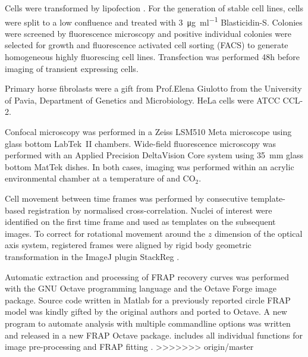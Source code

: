   Cells were transformed by lipofection .
  For the generation of stable cell lines,
  cells were split to a low confluence and treated
  with \SI{3}{\ug\per\ml} Blasticidin-S.
  Colonies were screened by fluorescence microscopy
  and positive individual colonies were selected for growth
  and fluorescence activated cell sorting (FACS) to generate
  homogeneous highly fluorescing cell lines.
  Transfection was performed 48h before imaging of
  transient expressing cells.

  Primary horse fibrolasts were a gift from Prof.\@ Elena Giulotto
  from the University of Pavia, Department of Genetics and
  Microbiology.  HeLa cells were ATCC CCL-2.

  Confocal microscopy was performed in a Zeiss LSM510 Meta microscope
  using glass bottom LabTek~II chambers.  Wide-field fluorescence
  microscopy was performed with an Applied Precision DeltaVision Core
  system using \SI{35}{\mm} glass bottom MatTek dishes.  In both
  cases, imaging was performed within an acrylic environmental chamber
  at a temperature of  and  CO$_2$.


  Cell movement between time frames was performed by consecutive
  template-based registration by normalised cross-correlation.
  Nuclei of interest were identified on the first time frame
  and used as templates on the subsequent images.
  To correct for rotational movement
  around the $z$ dimension of the optical axis system,
  registered frames were aligned by rigid body geometric transformation
  in the ImageJ \citep{imagej1} plugin StackReg \citep{stackreg}.

  Automatic extraction and processing of FRAP recovery curves was
  performed with the GNU Octave programming language \citep{octave}
  and the Octave Forge image package.  Source code written in Matlab
  for a previously reported circle FRAP model \citep{mcnally-frap-code}
  was kindly gifted by the original authors and ported to Octave.
  A new program to automate analysis with multiple commandline options
  was written and released in a new FRAP Octave package.
   includes all individual functions for image
  pre-processing and FRAP fitting .
>>>>>>> origin/master
